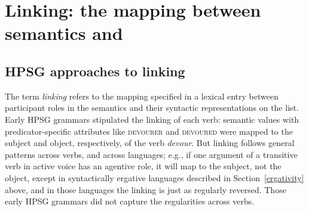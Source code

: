 \documentclass[output=paper
 	        ,biblatex
                ,babelshorthands
                ,newtxmath
                ,draftmode
                ,colorlinks, citecolor=brown
]{langscibook}
\begin{document}
\section{Linking: the mapping between semantics and \argst}
\label{linking-sec}

\subsection{HPSG approaches to linking}
\label{arg-st:sec-hpsg-approaches-to-linking}

The term \textit{linking} refers to the mapping specified in a lexical entry between participant
roles in the semantics and their
syntactic representations on the \argst list. Early HPSG grammars stipulated the linking of each
verb: semantic \content values with predicator-specific attributes like \textsc{devourer} and
\textsc{devoured} were mapped to the subject and object, respectively, of the verb \textit{devour}.
But linking follows general patterns across verbs, and across languages; e.g., if one argument of a
transitive verb in active voice has an agentive role, it will map to the subject, not the object,
except in syntactically ergative languages described in Section~\ref{ergativity} above, and in those
languages the linking is just as regularly reversed.  Those early HPSG grammars did not capture the
regularities across verbs.
\end{document}
